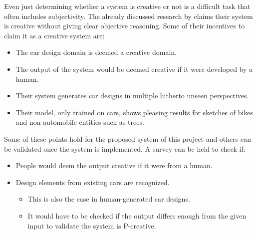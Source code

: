 Even just determining whether a system is creative or not is a difficult task that often includes subjectivity.
The already discussed research by \citet{creativecargan} claims their system is creative without giving clear objective reasoning.
Some of their incentives to claim it as a creative system are:
\begin{itemize}
    \item The car design domain is deemed a creative domain.
    \item The output of the system would be deemed creative if it were developed by a human.
    \item Their system generates car designs in multiple hitherto unseen perspectives.
    \item Their model, only trained on cars, shows pleasing results for sketches of bikes and non-automobile entities such as trees.
\end{itemize}

Some of these points hold for the proposed system of this project and others can be validated once the system is implemented.
A survey can be held to check if:
\begin{itemize}
    \item People would deem the output creative if it were from a human.
    \item Design elements from existing cars are recognized.
    \begin{itemize}
        \item This is also the case in human-generated car designs.
        \item It would have to be checked if the output differs enough from the given input to validate the system is P-creative.
    \end{itemize}
\end{itemize}